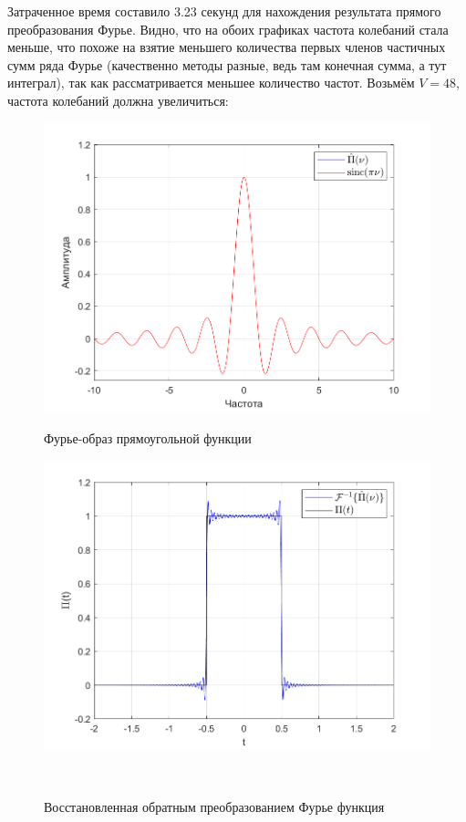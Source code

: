 \documentclass[a4paper]{article}
\begin{document}
Затраченное время составило 3.23 секунд для нахождения результата прямого преобразования Фурье. Видно, что на обоих графиках частота колебаний стала меньше, что похоже на взятие меньшего количества первых членов частичных сумм ряда Фурье (качественно методы разные, ведь там конечная сумма, а тут интеграл), так как рассматривается меньшее количество частот. Возьмём $V = 48$, частота колебаний должна увеличиться:

\begin{figure}[H]
    \begin{minipage}{0.5\textwidth}
        \centering \includegraphics[width=\textwidth]{graphs/1/T_4_dt_0.001_V_48_dv_0.001/fourier_numerical.png}
        \caption{Фурье-образ прямоугольной функции}
    \end{minipage}\hfill
    \begin{minipage}{0.5\textwidth}
        \centering \includegraphics[width=\textwidth]{graphs/1/T_4_dt_0.001_V_48_dv_0.001/func_inversed_fourier.png}
        \caption{Восстановленная обратным преобразованием Фурье функция}
    \end{minipage}\\[1em]
\end{figure}\noindent\
\end{document}
